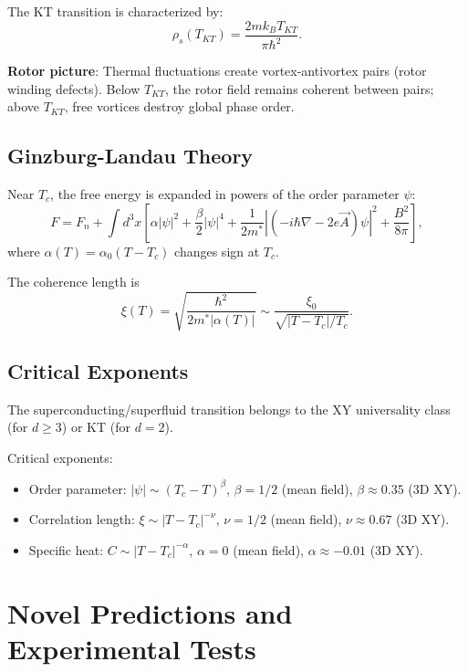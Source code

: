 \documentclass[12pt,a4paper]{article}
\theoremstyle{definition}
\theoremstyle{remark}
\begin{document}
The KT transition is characterized by:
\begin{equation}
\rho_s(T_{KT}) = \frac{2m k_B T_{KT}}{\pi \hbar^2}.
\end{equation}

\textbf{Rotor picture}: Thermal fluctuations create vortex-antivortex pairs (rotor winding defects). Below $T_{KT}$, the rotor field remains coherent between pairs; above $T_{KT}$, free vortices destroy global phase order.

\subsection{Ginzburg-Landau Theory}

Near $T_c$, the free energy is expanded in powers of the order parameter $\psi$:
\begin{equation}
F = F_n + \int d^3x \left[ \alpha |\psi|^2 + \frac{\beta}{2} |\psi|^4 + \frac{1}{2m^*} \left| \left(-i\hbar \nabla - 2e \vec{A}\right) \psi \right|^2 + \frac{B^2}{8\pi} \right],
\end{equation}
where $\alpha(T) = \alpha_0 (T - T_c)$ changes sign at $T_c$.

The coherence length is
\begin{equation}
\xi(T) = \sqrt{\frac{\hbar^2}{2m^* |\alpha(T)|}} \sim \frac{\xi_0}{\sqrt{|T - T_c|/T_c}}.
\end{equation}

\subsection{Critical Exponents}

The superconducting/superfluid transition belongs to the XY universality class (for $d \geq 3$) or KT (for $d=2$).

Critical exponents:
\begin{itemize}
\item Order parameter: $|\psi| \sim (T_c - T)^\beta$, $\beta = 1/2$ (mean field), $\beta \approx 0.35$ (3D XY).
\item Correlation length: $\xi \sim |T - T_c|^{-\nu}$, $\nu = 1/2$ (mean field), $\nu \approx 0.67$ (3D XY).
\item Specific heat: $C \sim |T - T_c|^{-\alpha}$, $\alpha = 0$ (mean field), $\alpha \approx -0.01$ (3D XY).
\end{itemize}

\section{Novel Predictions and Experimental Tests}
\end{document}
